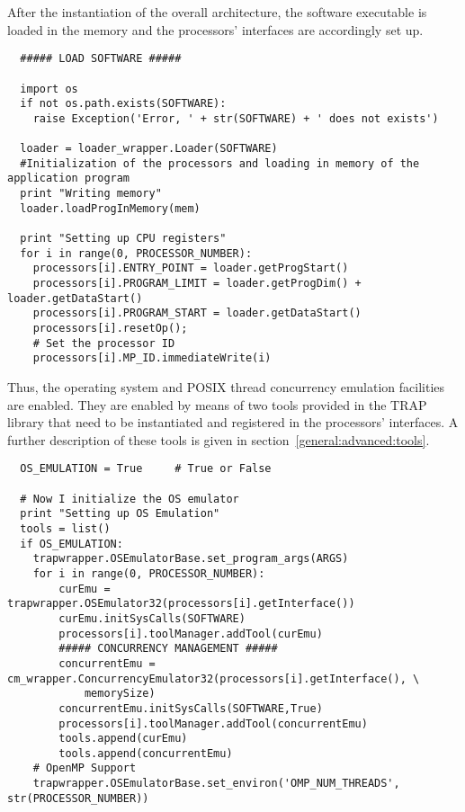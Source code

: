 \indent After the instantiation of the overall architecture, the software executable is loaded in the memory and the processors' interfaces are accordingly set up.

\scriptsize
\begin{verbatim}
  ##### LOAD SOFTWARE #####

  import os
  if not os.path.exists(SOFTWARE):
    raise Exception('Error, ' + str(SOFTWARE) + ' does not exists')

  loader = loader_wrapper.Loader(SOFTWARE)
  #Initialization of the processors and loading in memory of the application program
  print "Writing memory"
  loader.loadProgInMemory(mem)

  print "Setting up CPU registers"
  for i in range(0, PROCESSOR_NUMBER):
    processors[i].ENTRY_POINT = loader.getProgStart()
    processors[i].PROGRAM_LIMIT = loader.getProgDim() + loader.getDataStart()
    processors[i].PROGRAM_START = loader.getDataStart()
    processors[i].resetOp();
    # Set the processor ID
    processors[i].MP_ID.immediateWrite(i)
\end{verbatim}
\normalsize

\indent Thus, the operating system and POSIX thread concurrency emulation facilities are enabled. They are enabled by means of two tools provided in the TRAP library that need to be instantiated and registered in the processors' interfaces. A further description of these tools is given in section~\ref{general:advanced:tools}.

\scriptsize
\begin{verbatim}
  OS_EMULATION = True     # True or False

  # Now I initialize the OS emulator
  print "Setting up OS Emulation"
  tools = list()
  if OS_EMULATION:
    trapwrapper.OSEmulatorBase.set_program_args(ARGS)
    for i in range(0, PROCESSOR_NUMBER):
        curEmu = trapwrapper.OSEmulator32(processors[i].getInterface())
        curEmu.initSysCalls(SOFTWARE)
        processors[i].toolManager.addTool(curEmu)
        ##### CONCURRENCY MANAGEMENT #####
        concurrentEmu = cm_wrapper.ConcurrencyEmulator32(processors[i].getInterface(), \
            memorySize)
        concurrentEmu.initSysCalls(SOFTWARE,True)
        processors[i].toolManager.addTool(concurrentEmu)
        tools.append(curEmu)
        tools.append(concurrentEmu)
    # OpenMP Support
    trapwrapper.OSEmulatorBase.set_environ('OMP_NUM_THREADS', str(PROCESSOR_NUMBER)) 
\end{verbatim}
\normalsize

